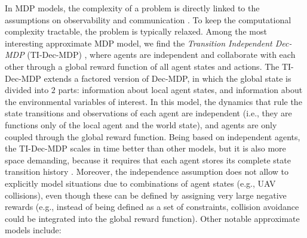 In MDP models, the complexity of a problem is directly linked to the assumptions on
observability and communication \cite{seuken2008}. To keep the computational complexity
tractable, the problem is typically relaxed. Among the most interesting approximate
MDP model, we find the \emph{Transition Independent Dec-MDP} (TI-Dec-MDP)
\cite{becker2004}, where agents are independent and collaborate with each other through a
global reward function of all agent states and actions. The TI-Dec-MDP extends
a factored version of Dec-MDP, in which the global state is divided into
$2$ parts: information about local agent states, and information about the environmental
variables of interest. In this model, the dynamics that rule the state transitions and
observations of each agent are independent (i.e., they are functions only of the local
agent and the world state), and agents are only coupled through the global reward
function. Being based on independent agents, the TI-Dec-MDP scales in time better than
other models, but it is also more space demanding, because it requires that each agent
stores its complete state transition history \cite{becker2004,redding2012}. Moreover, the
independence assumption does not allow to explicitly model situations due to combinations
of agent states (e.g., UAV collisions), even though these can be defined by assigning very
large negative rewards (e.g., instead of being defined as a set of constraints, collision
avoidance could be integrated into the global reward function). Other notable approximate
models include:
